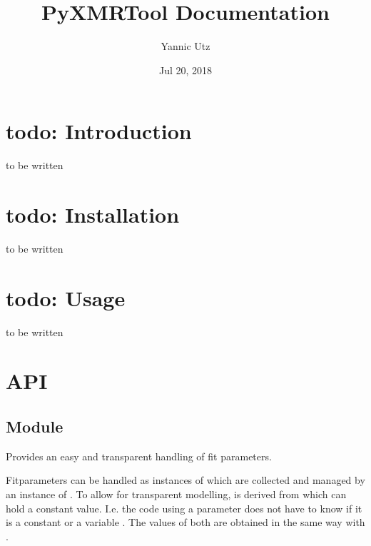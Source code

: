 \documentclass[letterpaper,10pt,english]{sphinxmanual}
\title{PyXMRTool Documentation}
\date{Jul 20, 2018}
\author{Yannic Utz}
\begin{document}
\maketitle
\sphinxtableofcontents
{}\label{\detokenize{index::doc}}



\chapter{todo: Introduction}
\label{\detokenize{intro:todo-introduction}}\label{\detokenize{intro::doc}}
to be written


\chapter{todo: Installation}
\label{\detokenize{install:todo-installation}}\label{\detokenize{install::doc}}
to be written


\chapter{todo: Usage}
\label{\detokenize{usage:todo-usage}}\label{\detokenize{usage::doc}}
to be written


\chapter{API}
\label{\detokenize{api:api}}\label{\detokenize{api::doc}}

\section{Module }
\label{\detokenize{modules-api/parameters:module-Parameters}}\label{\detokenize{modules-api/parameters:module-parameters}}\label{\detokenize{modules-api/parameters::doc}}
Provides an easy and transparent handling of fit parameters.

Fitparameters can be handled as instances of {\hyperref[\detokenize{modules-api/parameters:Parameters.Fitparameter}]{}} which are collected and managed by an instance of {\hyperref[\detokenize{modules-api/parameters:Parameters.ParameterPool}]{}}.
To allow for transparent modelling, {\hyperref[\detokenize{modules-api/parameters:Parameters.Fitparameter}]{}} is derived from {\hyperref[\detokenize{modules-api/parameters:Parameters.Parameter}]{}} which can hold a constant value.
I.e. the code using a parameter does not have to know if it is a constant {\hyperref[\detokenize{modules-api/parameters:Parameters.Parameter}]{}} or a variable {\hyperref[\detokenize{modules-api/parameters:Parameters.Fitparameter}]{}}.
The values of both are obtained in the same way with .
\end{document}
